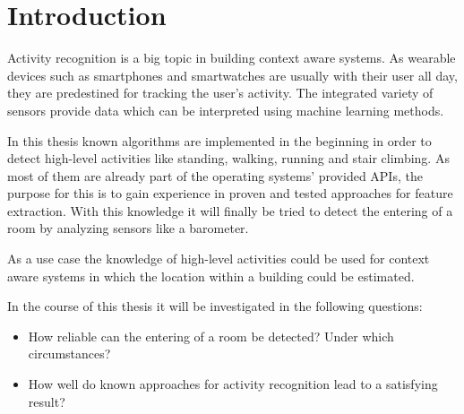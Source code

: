\chapter{Introduction}
\label{cha:Introduction}

Activity recognition is a big topic in building context aware systems. As wearable devices such as smartphones and smartwatches are usually with their user all day, they are predestined for tracking the user's activity. The integrated variety of sensors provide data which can be interpreted using machine learning methods. 

In this thesis known algorithms are implemented in the beginning in order to detect high-level activities like standing, walking, running and stair climbing. As most of them are already part of the operating systems' provided APIs, the purpose for this is to gain experience in proven and tested approaches for feature extraction. With this knowledge it will finally be tried to detect the entering of a room by analyzing sensors like a barometer. 

As a use case the knowledge of high-level activities could be used for context aware systems in which the location within a building could be estimated. 

In the course of this thesis it will be investigated in the following questions:
\begin{itemize}
	\item How reliable can the entering of a room be detected? Under which circumstances?
	\item How well do known approaches for activity recognition lead to a satisfying result?
\end{itemize}

